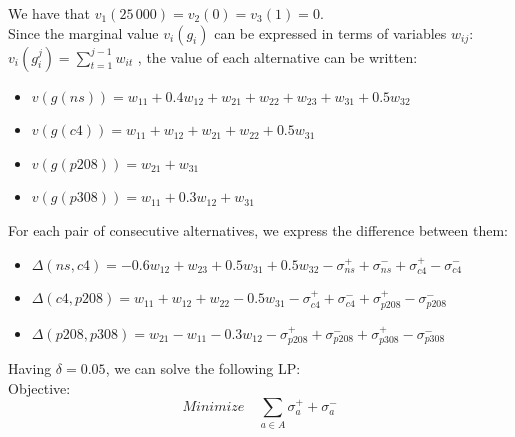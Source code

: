 \documentclass{report}
\begin{document}
We have that $v_1(25\,000) = v_2(0) = v_3(1) = 0$. \\
Since the marginal value $v_i(g_i)$ can be expressed in terms of variables $w_{ij}$: $v_i(g_i^{j}) = \sum _{t=1}^{j-1} w_{it}$ , the value of each alternative can be written: 
\begin{itemize}
\item $v(g(ns)) = w_{11} + 0.4w_{12} + w_{21} + w_{22} + w_{23} + w_{31} + 0.5w_{32}$
\item $v(g(c4)) = w_{11} + w_{12} + w_{21} + w_{22} + 0.5w_{31}$
\item $v(g(p208)) = w_{21} + w_{31} $
\item $v(g(p308)) = w_{11} + 0.3w_{12} + w_{31}$
\end{itemize}
For each pair of consecutive alternatives, we express the difference between them: 
\begin{itemize}
\item $\Delta (ns,c4) =  -0.6w_{12} + w_{23} + 0.5w_{31} +  0.5w_{32}  -\sigma _{ns}^{+} +\sigma _{ns}^{-} +\sigma _{c4}^{+} - \sigma _{c4}^{-} $
\item $\Delta (c4, p208) = w_{11} + w_{12} + w_{22} - 0.5w_{31} -\sigma _{c4}^{+} +\sigma _{c4}^{-} +\sigma _{p208}^{+} - \sigma _{p208}^{-} $
\item $\Delta (p208, p308) =w_{21} - w_{11} - 0.3w_{12} -\sigma _{p208}^{+} +\sigma _{p208}^{-} +\sigma _{p308}^{+} - \sigma _{p308}^{-} $
\end{itemize}
Having $\delta = 0.05$, we can solve the following LP:\\

Objective:  
\begin{equation}
	Minimize \quad \sum_{a \in A} \sigma _{a}^{+} + \sigma _{a}^{-}
\end{equation}
\end{document}
